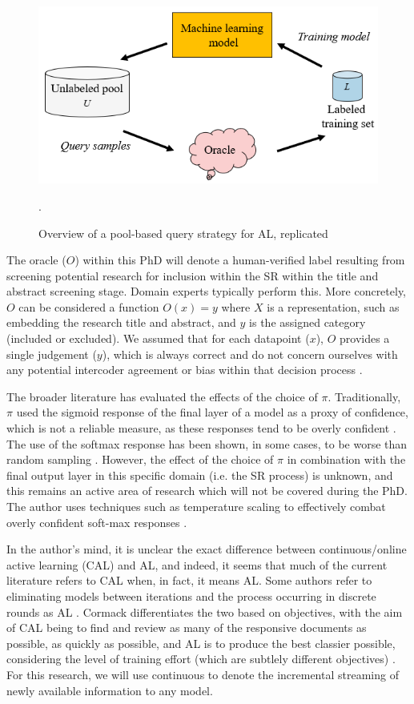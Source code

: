 \documentclass[10pt, english]{article}
\begin{document}
\begin{figure}
\centering
\includegraphics[width=0.5\linewidth]{images/pool_based_strategy.png}
\caption{Overview of a pool-based query strategy for AL, replicated\cite{ren_survey_2021}}.
\label{fig:pool_based_query}
\end{figure}

The oracle ($O$) within this PhD will denote a human-verified label resulting from screening potential research for inclusion within the SR within the title and abstract screening stage. Domain experts typically perform this. More concretely, $O$ can be considered a function $O(x) = y$ where $X$ is a representation, such as embedding the research title and abstract, and $y$ is the assigned category (included or excluded). We assumed that for each datapoint ($x$), $O$ provides a single judgement ($y$), which is always correct and do not concern ourselves with any potential intercoder agreement or bias within that decision process \cite{artstein_survey_2008}.

The broader literature has evaluated the effects of the choice of $\pi$. Traditionally, $\pi$ used the sigmoid response of the final layer of a model as a proxy of confidence, which is not a reliable measure, as these responses tend to be overly confident \cite{pearce_understanding_2021}. The use of the softmax response has been shown, in some cases, to be worse than random sampling \cite{wang_new_2014}. However, the effect of the choice of $\pi$ in combination with the final output layer in this specific domain (i.e. the SR process) is unknown, and this remains an active area of research which will not be covered during the PhD. The author uses techniques such as temperature scaling to effectively combat overly confident soft-max responses \cite{guo_calibration_2017}.



In the author's mind, it is unclear the exact difference between continuous/online active learning (CAL) and AL, and indeed, it seems that much of the current literature refers to CAL when, in fact, it means AL. Some authors refer to eliminating models between iterations and the process occurring in discrete rounds as AL \cite{settles_active_2009}. Cormack differentiates the two based on objectives, with the aim of CAL being to find and review as many of the responsive documents as possible, as quickly as possible, and AL is to produce the best classier possible, considering the level of training effort (which are subtlely different objectives) \cite{cormack_autonomy_2015}. For this research, we will use continuous to denote the incremental streaming of newly available information to any model. 
\end{document}
